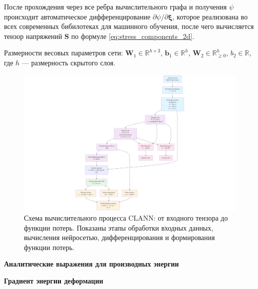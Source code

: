 После прохождения через все ребра вычислительного графа 
и получения $\psi$ происходит автоматическое дифференцирование $\partial\psi/\partial\boldsymbol{\xi}$, 
которое реализована во всех современных бибилотеках для машинного обучения,
после чего вычисляется тензор напряжений $\mathbf{S}$ по формуле \eqref{eq:stress_components_2d}.

Размерности весовых параметров сети: $\mathbf{W}_1 \in \mathbb{R}^{h \times 3}$, $\mathbf{b}_1 \in \mathbb{R}^{h}$,
 $\mathbf{W}_2 \in \mathbb{R}^{h}_{\geq 0}$, $b_2 \in \mathbb{R}$, где $h$ — размерность скрытого слоя.





\begin{figure}[htbp]
\centering
\includegraphics[width=1.3\textwidth]{img/clann_arc.png}
\caption{Схема вычислительного процесса CLANN: от входного тензора до функции потерь. Показаны этапы обработки входных данных, вычисления нейросетью, дифференцирования и формирования функции потерь.}
\label{fig:clann_architecture}
\end{figure}

\textbf{Аналитические выражения для производных энергии}

\textbf{Градиент энергии деформации}

